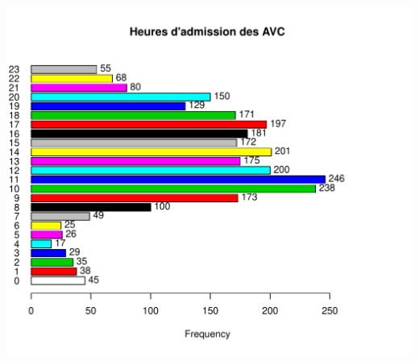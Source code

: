 \documentclass[12pt,english,french,twoside]{book}\usepackage[]{graphicx}\usepackage[]{color}
\makeatletter
\def\maxwidth{ %
  \ifdim\Gin@nat@width>\linewidth
    \linewidth
  \else
    \Gin@nat@width
  \fi
}
\newenvironment{knitrout}{}{} %
\makeatother
\begin{document}
\begin{knitrout}
\color{fgcolor}
\includegraphics[width=\maxwidth]{figure/heure_avc2-1} 

\end{knitrout}
\end{document}
